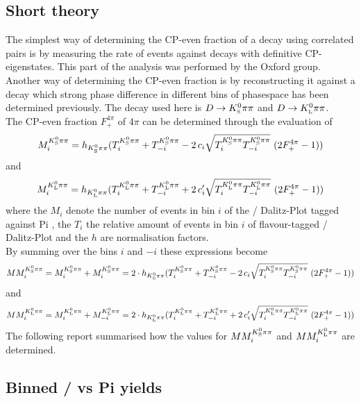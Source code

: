 \subsection{Short theory}
The simplest way of determining the CP-even fraction of a decay using correlated pairs is by measuring the rate of events against decays with definitive CP-eigenstates. This part of the analysis was performed by the Oxford group.\\
Another way of determining the CP-even fraction is by reconstructing it against a decay which strong phase difference in different bins of phasespace has been determined previously. The decay used here is $\D \rightarrow \KsPiPi$ and $\D \rightarrow \KlPiPi$.\\
The CP-even fraction $F_+^{4\pi}$ of $ 4\pi$ can be determined through the evaluation of
\begin{equation}
M^{\KsPiPi}_i = h_{\KsPiPi} (T^{\KsPiPi}_i + T^{\KsPiPi}_{-i} - 2 \, c_i  \sqrt{T^{\KsPiPi}_i T^{\KsPiPi}_{-i}} \ (2 F_+^{4\pi} -1))
\end{equation}
and
\begin{equation}
M^{\KlPiPi}_i =  h_{\KlPiPi} (T^{\KlPiPi}_i + T^{\KlPiPi}_{-i} + 2 \, c'_i  \sqrt{T^{\KlPiPi}_i T^{\KlPiPi}_{-i}} \ (2 F_+^{4\pi} -1))
\end{equation}
where the $M_i$ denote the number of events in bin $i$ of the \KsPiPi / \KlPiPi Dalitz-Plot tagged against \4Pi , the $T_i$ the relative amount of events in bin $i$ of flavour-tagged \KsPiPi / \KlPiPi Dalitz-Plot and the $h$ are normalisation factors.\\
By summing over the bins $i$ and $-i$ these expressions become
\begin{equation}
MM^{\KsPiPi}_i = M^{\KsPiPi}_i + M^{\KsPiPi}_{i} =2\cdot h_{\KsPiPi} (T^{\KsPiPi}_i + T^{\KsPiPi}_{-i} - 2 \, c_i  \sqrt{T^{\KsPiPi}_i T^{\KsPiPi}_{-i}} \ (2 F_+^{4\pi} -1))
\end{equation}
and
\begin{equation}
MM^{\KlPiPi}_i = M^{\KlPiPi}_i + M^{\KlPiPi}_{-i} = 2\cdot h_{\KlPiPi} (T^{\KlPiPi}_i + T^{\KlPiPi}_{-i} + 2 \, c'_i  \sqrt{T^{\KlPiPi}_i T^{\KlPiPi}_{-i}} \ (2 F_+^{4\pi} -1))
\end{equation}
The following report summarised how the values for $MM^{\KsPiPi}_i$ and $MM^{\KlPiPi}_i$ are determined.\\


\subsection{Binned \KsPiPi / \KlPiPi vs \4Pi yields}

